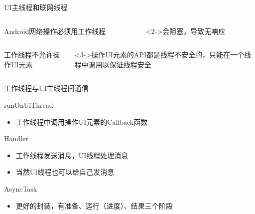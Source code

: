 \documentclass[presentation,dvipdfmx,CJKbookmarks]{beamer}
\begin{document}
\begin{CJK*}{UTF8}{simsun}
\begin{enumerate}
\begin{frame}[label={sec:orgb5780b6}]{UI主线程和联网线程}
\begin{columns}
\begin{column}{0.4\columnwidth}
\begin{block}{Android网络操作必须用工作线程}
\end{block}
\end{column}
\begin{column}{0.4\columnwidth}
\begin{block}<2->{会阻塞，导致无响应}
\end{block}
\end{column}
\end{columns}
\begin{columns}
\begin{column}{0.4\columnwidth}
\begin{block}{工作线程不允许操作UI元素}
\end{block}
\end{column}
\begin{column}{0.4\columnwidth}
\begin{block}<3->{操作UI元素的API都是线程不安全的，只能在一个线程中调用以保证线程安全}
\end{block}
\end{column}
\end{columns}
\end{frame}

\begin{frame}[label={sec:orgbd63715}]{工作线程与UI主线程间通信}
\begin{block}{runOnUiThread}
\begin{itemize}
\item 工作线程中调用操作UI元素的Callback函数
\end{itemize}
\end{block}
\begin{block}{Handler}
\begin{itemize}
\item 工作线程发送消息，UI线程处理消息
\item 当然UI线程也可以给自己发消息
\end{itemize}
\end{block}

\begin{block}{AsyncTask}
\begin{itemize}
\item 更好的封装，有准备、运行（进度）、结果三个阶段
\end{itemize}
\end{block}
\end{frame}


\end{enumerate}
\end{CJK*}
\end{document}
